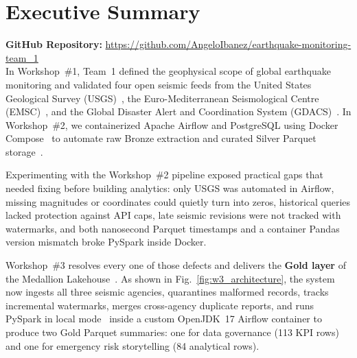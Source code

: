 \section{Executive Summary}
\noindent\textbf{GitHub Repository:} \url{https://github.com/AngeloIbanez/earthquake-monitoring-team_1}\\[0.15cm]

In Workshop~\#1, Team~1 defined the geophysical scope of global earthquake monitoring and validated four open seismic feeds from the United States Geological Survey (USGS)~\cite{usgs_fdsn,usgs_rt}, the Euro-Mediterranean Seismological Centre (EMSC)~\cite{emsc_fdsn}, and the Global Disaster Alert and Coordination System (GDACS)~\cite{gdacs}. In Workshop~\#2, we containerized Apache Airflow and PostgreSQL using Docker Compose~\cite{docker_docs,airflow_docs,postgres_docs} to automate raw Bronze extraction and curated Silver Parquet storage~\cite{parquet_docs}.

Experimenting with the Workshop~\#2 pipeline exposed practical gaps that needed fixing before building analytics: only USGS was automated in Airflow, missing magnitudes or coordinates could quietly turn into zeros, historical queries lacked protection against API caps, late seismic revisions were not tracked with watermarks, and both nanosecond Parquet timestamps and a container Pandas version mismatch broke PySpark inside Docker.

Workshop~\#3 resolves every one of those defects and delivers the \textbf{Gold layer} of the Medallion Lakehouse~\cite{armbrust2021lakehouse}. As shown in Fig.~\ref{fig:w3_architecture}, the system now ingests all three seismic agencies, quarantines malformed records, tracks incremental watermarks, merges cross-agency duplicate reports, and runs PySpark in local mode~\cite{pyspark_docs} inside a custom OpenJDK~17 Airflow container to produce two Gold Parquet summaries: one for data governance (113 KPI rows) and one for emergency risk storytelling (84 analytical rows).

